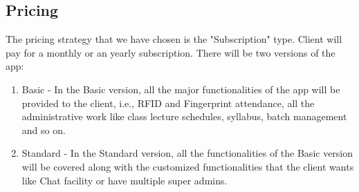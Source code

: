 \subsection{Pricing}
\hspace{.8cm} The pricing strategy that we have chosen is the "Subscription" type. Client will pay for a monthly or an yearly subscription. There will be two versions of the app:
\begin{enumerate}
    \item Basic - In the Basic version, all the major functionalities of the app will be provided to the client, i.e., RFID and Fingerprint attendance, all the administrative work like class lecture schedules, syllabus, batch management and so on.
    \item Standard - In the Standard version, all the functionalities of the Basic version will be covered along with the customized functionalities that the client wants like Chat facility or have multiple super admins.
\end{enumerate}
